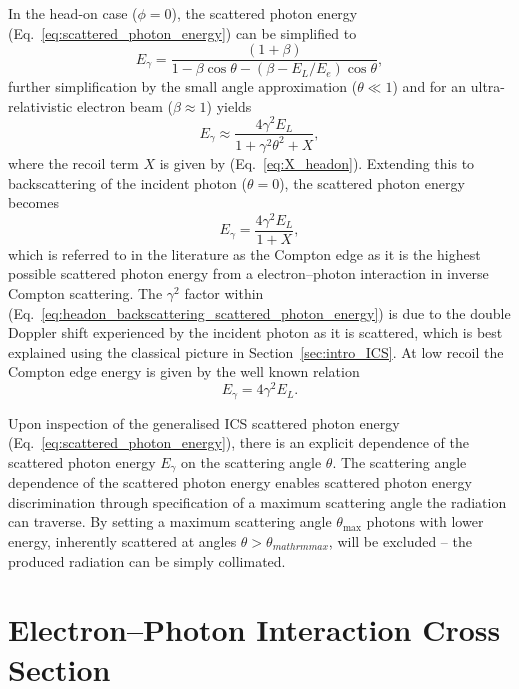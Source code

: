 \documentclass[../main.tex]{subfiles}
\begin{document}
In the head-on case ($\phi=0$), the scattered photon energy (Eq.~\ref{eq:scattered_photon_energy}) can be simplified to 
\begin{equation}
E_{\gamma} = \frac{\left(1+\beta\right)}{1-\beta\cos\theta-\left(\beta-E_{L}/E_{e}\right)\cos\theta},
\label{eq:headon_scattered_photon_energy}
\end{equation}
further simplification by the small angle approximation ($\theta \ll 1$) and for an ultra-relativistic electron beam ($\beta \approx 1$) yields
\begin{equation}
E_{\gamma} \approx \frac{4\gamma^{2}E_{L}}{1+\gamma^{2}\theta^{2}+X},   
\label{eq:small_angle_scattered_photon_energy}
\end{equation}
where the recoil term $X$ is given by (Eq.~\ref{eq:X_headon}). Extending this to backscattering of the incident photon ($\theta = 0$), the scattered photon energy becomes
\begin{equation}
E_{\gamma} = \frac{4\gamma^{2}E_{L}}{1+X},
\label{eq:headon_backscattering_scattered_photon_energy}
\end{equation}
which is referred to in the literature \cite{krafft2010compton} as the Compton edge as it is the highest possible scattered photon energy from a electron--photon interaction in inverse Compton scattering. The $\gamma^{2}$ factor within (Eq.~\ref{eq:headon_backscattering_scattered_photon_energy}) is due to the double Doppler shift experienced by the incident photon as it is scattered, which is best explained using the classical picture in Section~\ref{sec:intro_ICS}. At low recoil the Compton edge energy is given by the well known relation
\begin{equation}
E_{\gamma} = 4\gamma^{2}E_{L}.
\label{eq:compton_edge_energy}    
\end{equation}

Upon inspection of the generalised ICS scattered photon energy (Eq.~\ref{eq:scattered_photon_energy}), there is an explicit dependence of the scattered photon energy $E_{\gamma}$ on the scattering angle $\theta$. The scattering angle dependence of the scattered photon energy enables scattered photon energy discrimination through specification of a maximum scattering angle the radiation can traverse. By setting a maximum scattering angle $\theta_{\mathrm{max}}$ photons with lower energy, inherently scattered at angles $\theta > \theta_{mathrm{max}}$, will be excluded -- the produced radiation can be simply collimated.   

\section{Electron--Photon Interaction Cross Section}
\label{sec:electron_photon_interaction_cross_section}
\end{document}
